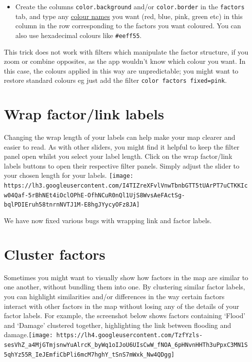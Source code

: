 \documentclass[
]{book}
\providecommand{\tightlist}{%
  \setlength{\itemsep}{0pt}\setlength{\parskip}{0pt}}
\begin{document}
\begin{itemize}
\tightlist
\item
  Create the columns \texttt{color.background} and/or \texttt{color.border} in the \texttt{factors} tab, and type any \href{https://www.w3schools.com/tags/ref_colornames.asp}{colour names} you want (red, blue, pink, green etc) in this column in the row corresponding to the factors you want coloured. You can also use hexadecimal colours like \texttt{\#eeff55}.
\end{itemize}

This trick does not work with filters which manipulate the factor structure, if you zoom or combine opposites, as the app wouldn't know which colour you want. In this case, the colours applied in this way are unpredictable; you might want to restore standard colours eg just add the filter \texttt{color\ factors\ fixed=pink}.

\hypertarget{wrap-factorlink-labels}{%
\section{Wrap factor/link labels}\label{wrap-factorlink-labels}}

Changing the wrap length of your labels can help make your map clearer and easier to read. As with other sliders, you might find it helpful to keep the filter panel open whilst you select your label length. Click on the wrap factor/link labels buttons to open their respective filter panels. Simply adjust the slider to your chosen length for your labels. \texttt{[image: https://lh3.googleusercontent.com/I4TIZreXFvlVnwTbnbGTT5tUArPT7uCTKKIcw04Qaf-5rBhNEt4iOclOPhE-OfhNCuR0nQl1UjS8WvsAeFActSg-bqlPDIEruh58tnrnNVTJ1M-E8hgJYycyOFz8JA]}

We have now fixed various bugs with wrapping link and factor labels.

\hypertarget{xcluster-factors}{%
\section{Cluster factors}\label{xcluster-factors}}

Sometimes you might want to visually show how factors in the map are similar to one another, without bundling them into one. By clustering similar factor labels, you can highlight similarities and/or differences in the way certain factors interact with other factors in the map without losing any of the details of your factor labels. For example, the screenshot below shows factors containing `Flood' and `Damage' clustered together, highlighting the link between flooding and damage.\texttt{[image: https://lh4.googleusercontent.com/TzfYzls-sesVhZ\_a4MjGTmjsnwYuAlrcK\_byWq1oIJoU6UIsCwW\_fNOA\_6pHNvnHHTh3uPpxC3MN1S5qhYz55R\_IeJEmfiCbPli6mcM7hghY\_tSnS7mWxk\_Nw4QDgg]}
\end{document}
